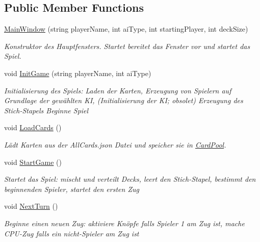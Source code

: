 \subsection*{Public Member Functions}
\begin{DoxyCompactItemize}
\item 
\mbox{\hyperlink{class_main_window_a159f4e738afbdf1dc79068aad1068725}{Main\+Window}} (string player\+Name, int ai\+Type, int starting\+Player, int deck\+Size)
\begin{DoxyCompactList}\small\item\em Konstruktor des Hauptfensters. Startet bereitet das Fenster vor und startet das Spiel. \end{DoxyCompactList}\item 
void \mbox{\hyperlink{class_main_window_afcb02d6059de11622938a544e3eda66a}{Init\+Game}} (string player\+Name, int ai\+Type)
\begin{DoxyCompactList}\small\item\em Initialisierung des Spiels\+: Laden der Karten, Erzeugung von Spielern auf Grundlage der gewählten KI, (Initialisierung der KI; obsolet) Erzeugung des Stich-\/\+Stapels Beginne Spiel \end{DoxyCompactList}\item 
void \mbox{\hyperlink{class_main_window_ad9f0cc9d0eafd2f12bbe701c1183450e}{Load\+Cards}} ()
\begin{DoxyCompactList}\small\item\em Lädt Karten aus der All\+Cards.\+json Datei und speicher sie in \mbox{\hyperlink{class_main_window_ae1c30b48118e2c8c6cd16171fab0cd31}{Card\+Pool}}. \end{DoxyCompactList}\item 
void \mbox{\hyperlink{class_main_window_a1eb0f2f5d231502046a64fef4a894a80}{Start\+Game}} ()
\begin{DoxyCompactList}\small\item\em Startet das Spiel\+: mischt und verteilt Decks, leert den Stich-\/\+Stapel, bestimmt den beginnenden Spieler, startet den ersten Zug \end{DoxyCompactList}\item 
void \mbox{\hyperlink{class_main_window_a66c105aa2c336bc2b05d9d574ab4eb74}{Next\+Turn}} ()
\begin{DoxyCompactList}\small\item\em Beginne einen neuen Zug\+: aktiviere Knöpfe falls Spieler 1 am Zug ist, mache C\+P\+U-\/\+Zug falls ein nicht-\/\+Spieler am Zug ist \end{DoxyCompactList}\item 

\end{DoxyCompactItemize}
